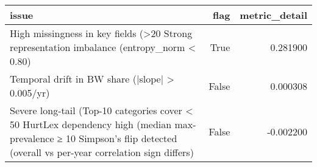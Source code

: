 \begin{tabular}{lrr}
\toprule
issue & flag & metric_detail \\
\midrule
High missingness in key fields (>20%
Strong representation imbalance (entropy_norm < 0.80) & True & 0.281900 \\
Temporal drift in BW share (|slope| > 0.005/yr) & False & 0.000308 \\
Severe long-tail (Top-10 categories cover < 50%
HurtLex dependency high (median max-prevalence ≥ 10%
Simpson’s flip detected (overall vs per-year correlation sign differs) & False & -0.002200 \\
\bottomrule
\end{tabular}
